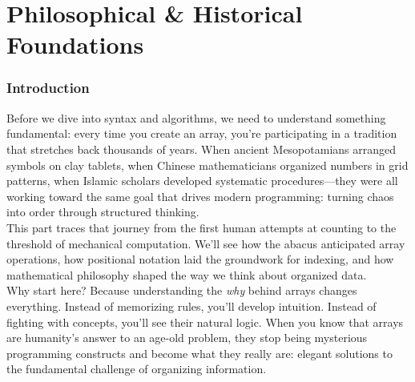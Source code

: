 \part{Philosophical \& Historical Foundations}
\section*{Introduction}
Before we dive into syntax and algorithms, we need to understand something fundamental: every time you create an array, you're participating in a tradition that stretches back thousands of years. When ancient Mesopotamians arranged symbols on clay tablets, when Chinese mathematicians organized numbers in grid patterns, when Islamic scholars developed systematic procedures—they were all working toward the same goal that drives modern programming: turning chaos into order through structured thinking.\\
This part traces that journey from the first human attempts at counting to the threshold of mechanical computation. We'll see how the abacus anticipated array operations, how positional notation laid the groundwork for indexing, and how mathematical philosophy shaped the way we think about organized data.\\
Why start here? Because understanding the \emph{why} behind arrays changes everything. Instead of memorizing rules, you'll develop intuition. Instead of fighting with concepts, you'll see their natural logic. When you know that arrays are humanity's answer to an age-old problem, they stop being mysterious programming constructs and become what they really are: elegant solutions to the fundamental challenge of organizing information.